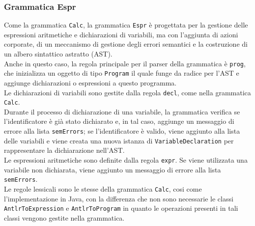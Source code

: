 \documentclass{article}
\begin{document}
\subsubsection{Grammatica Espr}

Come la grammatica \texttt{Calc}, la grammatica \texttt{Espr} è progettata per la gestione delle espressioni aritmetiche e dichiarazioni di variabili, ma con l'aggiunta di azioni corporate, di un meccanismo di gestione degli errori semantici e la costruzione di un albero sintattico astratto (AST). 
\\\noindent
Anche in questo caso, la regola principale per il parser della grammatica è \texttt{prog}, che inizializza un oggetto di tipo \texttt{Program} il quale funge da radice per l'AST e aggiunge dichiarazioni o espressioni a questo programma.
\\\noindent
Le dichiarazioni di variabili sono gestite dalla regola \texttt{decl}, come nella grammatica \texttt{Calc}. 
\\\noindent
Durante il processo di dichiarazione di una variabile, la grammatica verifica se l'identificatore è già stato dichiarato e, in tal caso, aggiunge un messaggio di errore alla lista \texttt{semErrors}; se l'identificatore è valido, viene aggiunto alla lista delle variabili e viene creata una nuova istanza di \texttt{VariableDeclaration} per rappresentare la dichiarazione nell'AST.
\\\noindent
Le espressioni aritmetiche sono definite dalla regola \texttt{expr}. Se viene utilizzata una variabile non dichiarata, viene aggiunto un messaggio di errore alla lista \texttt{semErrors}.
\\\noindent
Le regole lessicali sono le stesse della grammatica \texttt{Calc}, cosi come l'implementazione in Java, con la differenza che non sono necessarie le classi \texttt{AntlrToExpression} e \texttt{AntlrToProgram} in quanto le operazioni presenti in tali classi vengono gestite nella grammatica.
\end{document}
